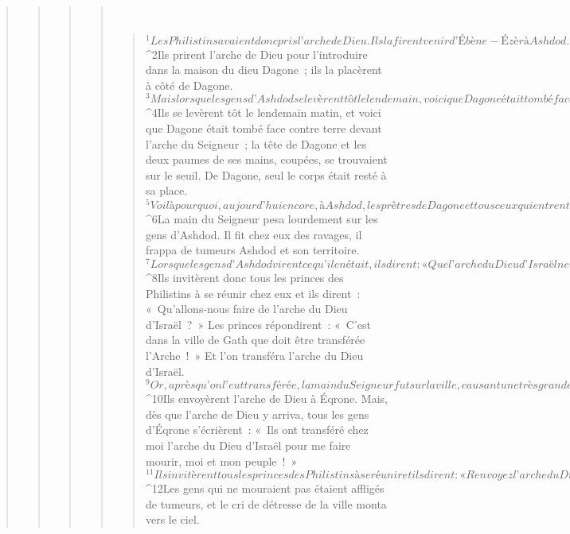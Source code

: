 \begin{verse}
\begin{verse}
\begin{verse}
\begin{verse}
         
      \bchapter{}
      \begin{verse}
${}^{1}Les Philistins avaient donc pris l’arche de Dieu. Ils la firent venir d’Ébène-Ézèr à Ashdod. 
${}^{2}Ils prirent l’arche de Dieu pour l’introduire dans la maison du dieu Dagone ; ils la placèrent à côté de Dagone. 
${}^{3}Mais lorsque les gens d’Ashdod se levèrent tôt le lendemain, voici que Dagone était tombé face contre terre devant l’arche du Seigneur. Ils prirent Dagone et le remirent à sa place. 
${}^{4}Ils se levèrent tôt le lendemain matin, et voici que Dagone était tombé face contre terre devant l’arche du Seigneur ; la tête de Dagone et les deux paumes de ses mains, coupées, se trouvaient sur le seuil. De Dagone, seul le corps était resté à sa place. 
${}^{5}Voilà pourquoi, aujourd’hui encore, à Ashdod, les prêtres de Dagone et tous ceux qui entrent dans la maison de Dagone évitent de fouler le seuil.
${}^{6}La main du Seigneur pesa lourdement sur les gens d’Ashdod. Il fit chez eux des ravages, il frappa de tumeurs Ashdod et son territoire. 
${}^{7}Lorsque les gens d’Ashdod virent ce qu’il en était, ils dirent : « Que l’arche du Dieu d’Israël ne reste pas chez nous, car sa main s’est faite dure contre nous et contre Dagone notre dieu ! » 
${}^{8}Ils invitèrent donc tous les princes des Philistins à se réunir chez eux et ils dirent : « Qu’allons-nous faire de l’arche du Dieu d’Israël ? » Les princes répondirent : « C’est dans la ville de Gath que doit être transférée l’Arche ! » Et l’on transféra l’arche du Dieu d’Israël.
${}^{9}Or, après qu’on l’eut transférée, la main du Seigneur fut sur la ville, causant une très grande panique. Le Seigneur frappa les gens de la ville du plus petit au plus grand : ils eurent des éruptions de tumeurs. 
${}^{10}Ils envoyèrent l’arche de Dieu à Éqrone. Mais, dès que l’arche de Dieu y arriva, tous les gens d’Éqrone s’écrièrent : « Ils ont transféré chez moi l’arche du Dieu d’Israël pour me faire mourir, moi et mon peuple ! » 
${}^{11}Ils invitèrent tous les princes des Philistins à se réunir et ils dirent : « Renvoyez l’arche du Dieu d’Israël, qu’elle retourne à l’endroit où elle était et qu’elle ne me fasse pas mourir, moi et mon peuple ! » En effet, il y avait dans toute la ville une panique de mort : la main de Dieu pesait très lourdement sur elle. 
${}^{12}Les gens qui ne mouraient pas étaient affligés de tumeurs, et le cri de détresse de la ville monta vers le ciel.
      

\end{verse}
\end{verse}
\end{verse}
\end{verse}
\end{verse}

